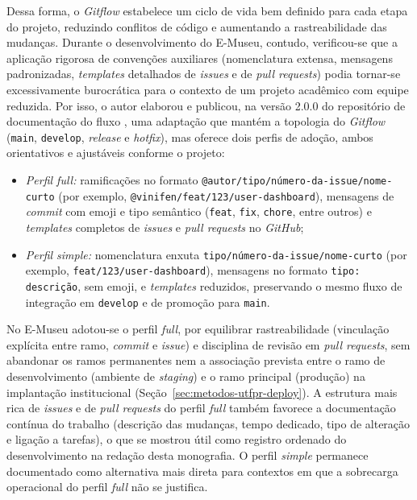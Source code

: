 Dessa forma, o \textit{Gitflow} estabelece um ciclo de vida bem definido para cada etapa do projeto, reduzindo conflitos de código e aumentando a rastreabilidade das mudanças. Durante o desenvolvimento do E-Museu, contudo, verificou-se que a aplicação rigorosa de convenções auxiliares (nomenclatura extensa, mensagens padronizadas, \textit{templates} detalhados de \textit{issues} e de \textit{pull requests}) podia tornar-se excessivamente burocrática para o contexto de um projeto acadêmico com equipe reduzida. Por isso, o autor elaborou e publicou, na versão 2.0.0 do repositório de documentação do fluxo \cite{gitflowdoc}, uma adaptação que mantém a topologia do \textit{Gitflow} (\texttt{main}, \texttt{develop}, \textit{release} e \textit{hotfix}), mas oferece dois perfis de adoção, ambos orientativos e ajustáveis conforme o projeto:

\begin{itemize}
    \item \textit{Perfil full:} ramificações no formato \texttt{@autor/tipo/número-da-issue/nome-curto} (por exemplo, \texttt{@vinifen/feat/123/user-dashboard}), mensagens de \textit{commit} com emoji e tipo semântico (\texttt{feat}, \texttt{fix}, \texttt{chore}, entre outros) e \textit{templates} completos de \textit{issues} e \textit{pull requests} no \textit{GitHub};
    \item \textit{Perfil simple:} nomenclatura enxuta \texttt{tipo/número-da-issue/nome-curto} (por exemplo, \texttt{feat/123/user-dashboard}), mensagens no formato \texttt{tipo: descrição}, sem emoji, e \textit{templates} reduzidos, preservando o mesmo fluxo de integração em \texttt{develop} e de promoção para \texttt{main}.
\end{itemize}

No E-Museu adotou-se o perfil \textit{full}, por equilibrar rastreabilidade (vinculação explícita entre ramo, \textit{commit} e \textit{issue}) e disciplina de revisão em \textit{pull requests}, sem abandonar os ramos permanentes nem a associação prevista entre o ramo de desenvolvimento (ambiente de \textit{staging}) e o ramo principal (produção) na implantação institucional (Seção~\ref{sec:metodos-utfpr-deploy}). A estrutura mais rica de \textit{issues} e de \textit{pull requests} do perfil \textit{full} também favorece a documentação contínua do trabalho (descrição das mudanças, tempo dedicado, tipo de alteração e ligação a tarefas), o que se mostrou útil como registro ordenado do desenvolvimento na redação desta monografia. O perfil \textit{simple} permanece documentado como alternativa mais direta para contextos em que a sobrecarga operacional do perfil \textit{full} não se justifica.



